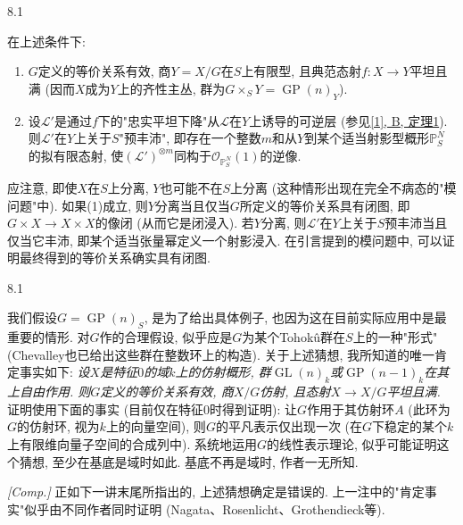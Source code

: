 \begin{conjecture}{8.1}\label{fga3.iii-8-conjecture-8.1}\skipsinglepar
\par{}在上述条件下: 
\begin{enumerate}\item{}\(G\)定义的等价关系有效, 商\(Y=X/G\)在\(S\)上有限型, 且典范态射\(f\colon  X\to  Y\)平坦且满 (因而\(X\)成为\(Y\)上的齐性主丛, 群为\(G\times _S Y=\operatorname {GP}(n)_Y\)).

      \item{}设\(\mathscr {L}'\)是通过\(f\)下的"忠实平坦下降"从\(\mathscr {L}\)在\(Y\)上诱导的可逆层 (参见\hyperref[fga3.i-b.1-theorem-1]{[1], B, 定理1}). 则\(\mathscr {L}'\)在\(Y\)上关于\(S\)"预丰沛", 即存在一个整数\(m\)和从\(Y\)到某个适当射影型概形\(\mathbb {P}_S^N\)的拟有限态射, 使\((\mathscr {L}')^{\otimes  m}\)同构于\(\mathcal {O}_{\mathbb {P}_S^N}(1)\)的逆像.
\end{enumerate}
\end{conjecture}
\par{}应注意, 即使\(X\)在\(S\)上分离, \(Y\)也可能不在\(S\)上分离 (这种情形出现在完全不病态的"模问题"中). 如果(1)成立, 则\(Y\)分离当且仅当\(G\)所定义的等价关系具有闭图, 即\(G\times  X\to  X\times  X\)的像闭 (从而它是闭浸入). 若\(Y\)分离, 则\(\mathscr {L}'\)在\(Y\)上关于\(S\)预丰沛当且仅当它丰沛, 即某个适当张量幂定义一个射影浸入. 在引言提到的模问题中, 可以证明最终得到的等价关系确实具有闭图.
\begin{remarks}{8.1}\label{fga3.iii-8-remarks-8.2}\skipsinglepar
\par{}我们假设\(G=\operatorname {GP}(n)_S\), 是为了给出具体例子, 也因为这在目前实际应用中是最重要的情形. 对\(G\)作的合理假设, 似乎应是\(G\)为某个Tohokû群在\(S\)上的一种"形式" (Chevalley也已给出这些群在整数环上的构造). 关于上述猜想, 我所知道的唯一肯定事实如下: \emph{设\(X\)是特征\(0\)的域\(k\)上的仿射概形, 群\(\operatorname {GL}(n)_k\)或\(\operatorname {GP}(n-1)_k\)在其上自由作用. 则\(G\)定义的等价关系有效, 商\(X/G\)仿射, 且态射\(X\to  X/G\)平坦且满.} 证明使用下面的事实 (目前仅在特征\(0\)时得到证明): 让\(G\)作用于其仿射环\(A\) (此环为\(G\)的仿射环, 视为\(k\)上的向量空间), 则\(G\)的平凡表示仅出现一次 (在\(G\)下稳定的某个\(k\)上有限维向量子空间的合成列中). 系统地运用\(G\)的线性表示理论, 似乎可能证明这个猜想, 至少在基底是域时如此. 基底不再是域时, 作者一无所知.
\end{remarks}
\begin{remark}{}\label{fga3.iii-8-remark-ii}\skipsinglepar
\par{}\emph{[Comp.]} 正如下一讲末尾所指出的, 上述猜想确定是错误的. 上一注中的"肯定事实"似乎由不同作者同时证明 (Nagata、Rosenlicht、Grothendieck等).
\end{remark}

